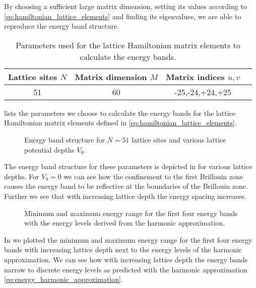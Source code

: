 By choosing a sufficient large matrix dimension, setting its values according
to \cref{eq:hamiltonian_lattice_elements} and finding its eigenvalues, we
are able to reproduce the energy band structure.
\begin{table}[htb]
  \centering
  \begin{tabular}{cccc}
    \toprule
    Lattice sites $N$ & Matrix dimension $M$ & Matrix indices $u,v$ \\
    \midrule
    51 & 60 & -25,-24,+24,+25 \\
    \bottomrule
  \end{tabular}
  \caption{Parameters used for the lattice Hamiltonian matrix elements to
    calculate the energy bands.
  }\label{tab:hamiltonian_elements}
\end{table}
 lists the parameters we choose to calculate
the energy bands for the lattice Hamiltonian matrix elements defined in
\cref{eq:hamiltonian_lattice_elements}.
\begin{figure}[htb]
  \centering
  \begin{adjustbox}{width=\textwidth}
    
  \end{adjustbox}
  \caption{Energy band structure for $N=51$ lattice sites and various lattice
    potential depths $V_0$.
  }\label{fig:scale_energy_structure}
\end{figure}
The energy band structure for these parameters is depicted in
 for various lattice depths. For $V_0=0$ we
can see how the confinement to the first Brillouin zone causes the energy band
to be reflective at the boundaries of the Brillouin zone. Further we see that
with increasing lattice depth the energy spacing increases.
\begin{figure}[htb]
  \centering
  \begin{adjustbox}{width=\textwidth}
    
  \end{adjustbox}
  \caption{Minimum and maximum energy range for the first four energy bands
    with the energy levels derived from the harmonic approximation.
  }\label{fig:scale_energy}
\end{figure}
In  we plotted the minimum and maximum energy range
for the first four energy bands with increasing lattice depth next to the
energy levels of the harmonic approximation. We can see how with increasing
lattice depth the energy bands narrow to discrete energy levels as predicted
with the harmonic approximation \cref{eq:energy_harmonic_approximation}.

